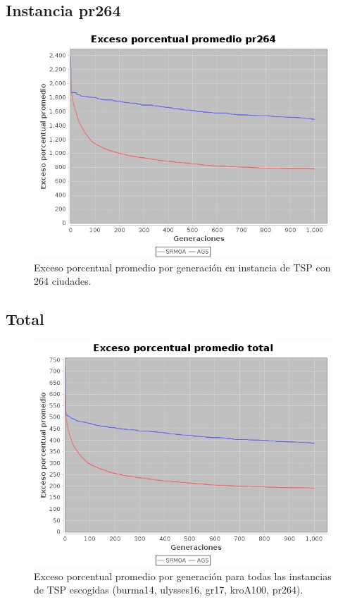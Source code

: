 \documentclass[12pt]{article}
\begin{document}
\subsection{Instancia pr264}
\begin{figure}[H]
  \centering
  \includegraphics[width=1\textwidth]{graficas/pr264}
  \caption{Exceso porcentual promedio por generación en instancia de TSP con 264 ciudades.}
\end{figure}
\subsection{Total}
\begin{figure}[H]
  \centering
  \includegraphics[width=1\textwidth]{graficas/total}
  \caption{Exceso porcentual promedio por generación para todas las instancias de TSP escogidas (burma14, ulysses16, gr17, kroA100, pr264).}
\end{figure}
\end{document}

